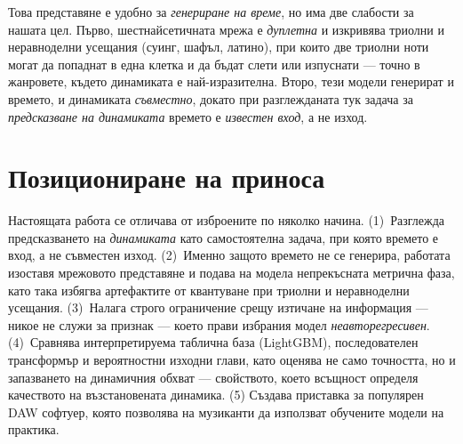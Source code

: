 Това представяне е удобно за \emph{генериране на време}, но има две слабости за
нашата цел. Първо, шестнайсетичната мрежа е \emph{дуплетна} и изкривява триолни
и неравноделни усещания (суинг, шафъл, латино), при които две триолни ноти могат
да попаднат в една клетка и да бъдат слети или изпуснати — точно в жанровете,
където динамиката е най-изразителна. Второ, тези модели генерират и времето, и
динамиката \emph{съвместно}, докато при разглежданата тук задача за
\emph{предсказване на динамиката} времето е \emph{известен вход}, а не изход.

\section{Позициониране на приноса}
\label{sec:svarzani-prinos}

Настоящата работа се отличава от изброените по няколко начина. (1)~Разглежда
предсказването на \emph{динамиката} като самостоятелна задача, при която времето
е вход, а не съвместен изход. (2)~Именно защото времето не
се генерира, работата изоставя мрежовото представяне и подава на модела
непрекъсната метрична фаза, като така избягва артефактите от квантуване при
триолни и неравноделни усещания. (3)~Налага строго ограничение срещу изтичане на
информация — никое  не служи за признак — което прави
избрания модел \emph{неавторегресивен}. (4)~Сравнява интерпретируема
таблична база (LightGBM), последователен трансформър и вероятностни
изходни глави, като оценява не само точността, но и запазването на динамичния
обхват — свойството, което всъщност определя качеството на възстановената
динамика. (5) Създава приставка за популярен DAW софтуер, която позволява
на музиканти да използват обучените модели на практика.
